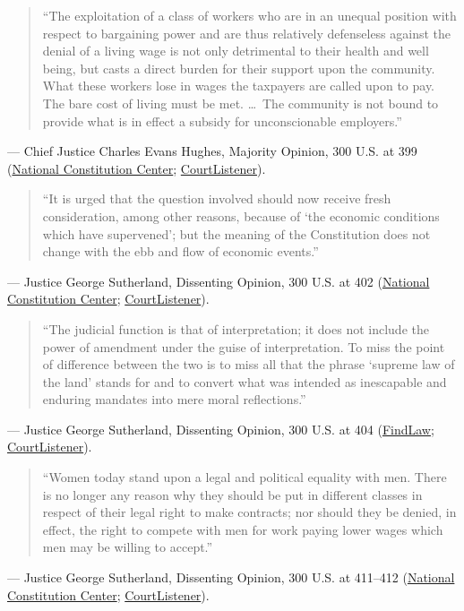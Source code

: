 \documentclass[12pt]{article}
\begin{document}
\begin{quote}
``The exploitation of a class of workers who are in an unequal position with respect to bargaining power and are thus relatively defenseless against the denial of a living wage is not only detrimental to their health and well being, but casts a direct burden for their support upon the community. What these workers lose in wages the taxpayers are called upon to pay. The bare cost of living must be met. \ldots\ The community is not bound to provide what is in effect a subsidy for unconscionable employers.''
\end{quote}
\noindent --- Chief Justice Charles Evans Hughes, Majority Opinion, 300 U.S. at 399 (\href{https://constitutioncenter.org/the-constitution/supreme-court-case-library/west-coast-hotel-co-v-parrish}{National Constitution Center}; \href{https://www.courtlistener.com/opinion/102784/west-coast-hotel-co-v-parrish/}{CourtListener}).

\begin{quote}
``It is urged that the question involved should now receive fresh consideration, among other reasons, because of `the economic conditions which have supervened'; but the meaning of the Constitution does not change with the ebb and flow of economic events.''
\end{quote}
\noindent --- Justice George Sutherland, Dissenting Opinion, 300 U.S. at 402 (\href{https://constitutioncenter.org/the-constitution/supreme-court-case-library/west-coast-hotel-co-v-parrish}{National Constitution Center}; \href{https://www.courtlistener.com/opinion/102784/west-coast-hotel-co-v-parrish/}{CourtListener}).

\begin{quote}
``The judicial function is that of interpretation; it does not include the power of amendment under the guise of interpretation. To miss the point of difference between the two is to miss all that the phrase `supreme law of the land' stands for and to convert what was intended as inescapable and enduring mandates into mere moral reflections.''
\end{quote}
\noindent --- Justice George Sutherland, Dissenting Opinion, 300 U.S. at 404 (\href{https://caselaw.findlaw.com/court/us-supreme-court/300/379.html}{FindLaw}; \href{https://www.courtlistener.com/opinion/102784/west-coast-hotel-co-v-parrish/}{CourtListener}).

\begin{quote}
``Women today stand upon a legal and political equality with men. There is no longer any reason why they should be put in different classes in respect of their legal right to make contracts; nor should they be denied, in effect, the right to compete with men for work paying lower wages which men may be willing to accept.''
\end{quote}
\noindent --- Justice George Sutherland, Dissenting Opinion, 300 U.S. at 411--412 (\href{https://constitutioncenter.org/the-constitution/supreme-court-case-library/west-coast-hotel-co-v-parrish}{National Constitution Center}; \href{https://www.courtlistener.com/opinion/102784/west-coast-hotel-co-v-parrish/}{CourtListener}).
\end{document}
